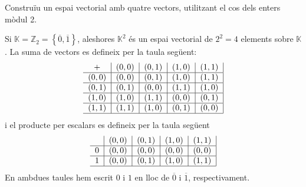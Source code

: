 \bigskip

\begin{exercici}
Construïu un espai vectorial amb quatre vectors, utilitzant el
cos dels enters mòdul 2.

\end{exercici}
\begin{solucio}
Si $\mathbb{K}=\mathbb{Z}_{2}=\left\{ \overline{0},\overline{1}\right\} $,
aleshores $\mathbb{K}^{2}$ és un espai vectorial de $2^{2}=4$ elements
sobre $\mathbb{K}$. La suma de vectors es defineix per la taula següent:%
\begin{equation*}
\begin{tabular}{c|c|c|c|c|}
$+$ & $(0,0)$ & $(0,1)$ & $(1,0)$ & $(1,1)$ \\ \hline
$(0,0)$ & $(0,0)$ & $(0,1)$ & $(1,0)$ & $(1,1)$ \\ \hline
$(0,1)$ & $(0,1)$ & $(0,0)$ & $(1,1)$ & $(1,0)$ \\ \hline
$(1,0)$ & $(1,0)$ & $(1,1)$ & $(0,0)$ & $(0,1)$ \\ \hline
$(1,1)$ & $(1,1)$ & $(1,0)$ & $(0,1)$ & $(0,0)$ \\ \hline
\end{tabular}%
\end{equation*}%
i el producte per escalars es defineix per la taula següent%
\begin{equation*}
\begin{tabular}{c|c|c|c|c|}
& $(0,0)$ & $(0,1)$ & $(1,0)$ & $(1,1)$ \\ \hline
$0$ & $(0,0)$ & $(0,0)$ & $(0,0)$ & $(0,0)$ \\ \hline
$1$ & $(0,0)$ & $(0,1)$ & $(1,0)$ & $(1,1)$ \\ \hline
\end{tabular}%
\end{equation*}%
En ambdues taules hem escrit $0$ i $1$ en lloc de $\overline{0}$ i $%
\overline{1}$, respectivament.
\end{solucio}

\bigskip

